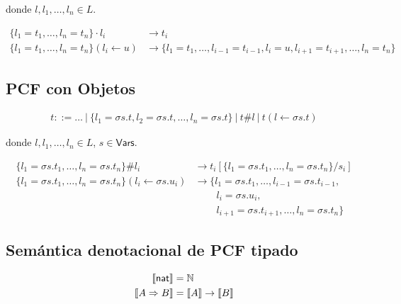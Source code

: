 \documentclass[twoside,a4paper,12pt]{article}
\theoremstyle{definition}
\theoremstyle{remark}
\begin{document}
donde $l,l_1,\dots,l_n\in L$.

\begin{align*}
  \{l_1=t_1,\dots,l_n=t_n\}\cdot l_i         &\to t_i\\
  \{l_1=t_1,\dots,l_n=t_n\}(l_i\leftarrow u) &\to
  \{l_1=t_1,\dots,l_{i-1}=t_{i-1},l_i=u,l_{i+1}=t_{i+1},\dots,l_n=t_n\}
\end{align*}

\subsection*{PCF con Objetos}
\begin{align*}
  t ::= \dots~|~\{l_1=\sigma s.t,l_2=\sigma s.t,\dots,l_n=\sigma s.t\}~|~t\#l~|~t(l\leftarrow \sigma s.t)
\end{align*}

donde $l,l_1,\dots,l_n\in L$, $s\in\mathsf{Vars}$.

\begin{align*}
  \{l_1 = \sigma s.t_1,\dots,l_n = \sigma s.t_n\}\#l_i
    &\to t_i[\{l_1 = \sigma s.t_1,\dots,l_n = \sigma s.t_n\}/s_i] \\
  \{l_1 = \sigma s.t_1,\dots,l_n = \sigma s.t_n\}(l_i\leftarrow\sigma s.u_i)
    &\to \{l_1 = \sigma s.t_1,\dots,l_{i-1} = \sigma s.t_{i-1}, \\
    &~\qquad l_i = \sigma s.u_i, \\
    &~\qquad l_{i+1} = \sigma s.t_{i+1},\dots,l_n = \sigma s.t_n\}
\end{align*}

\subsection*{Semántica denotacional de PCF tipado}

\begin{align*}
  \llbracket{\mathsf{nat}}\rrbracket           &= \mathbb N \\
  \llbracket{A\Rightarrow B}\rrbracket &= \llbracket{A}\rrbracket\to\llbracket{B}\rrbracket \\
\end{align*}
\end{document}
